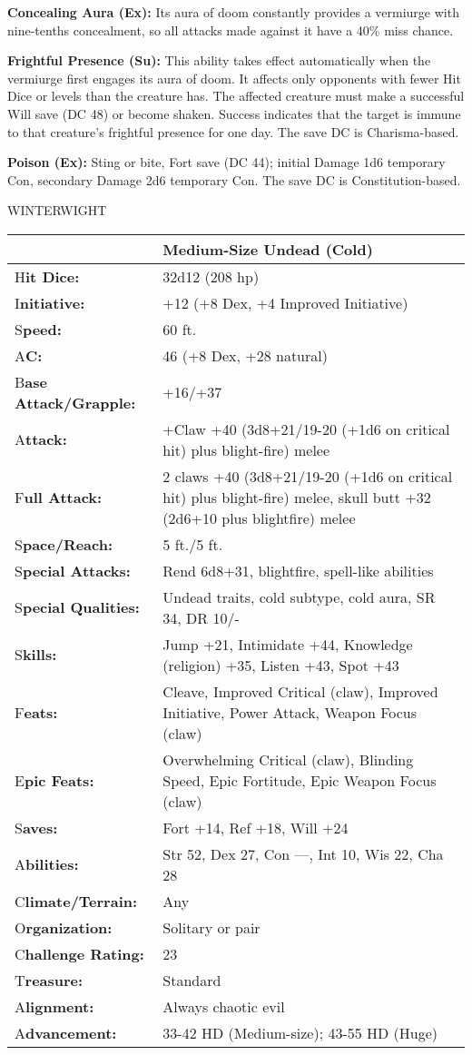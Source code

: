 \documentclass{article}
\begin{document}
{\textbf{Concealing Aura (Ex):} Its aura of doom constantly provides a vermiurge 
with nine-tenths concealment, so all attacks made against it have a 40\% miss chance. 

\textbf{Frightful Presence (Su):} This ability takes effect automatically when 
the vermiurge first engages its aura of doom. It affects only opponents with fewer 
Hit Dice or levels than the creature has. The affected creature must make a successful 
Will save (DC 48) or become shaken. Success indicates that the target is immune 
to that creature's frightful presence for one day. The save DC is Charisma-based.

\textbf{Poison (Ex):} Sting or bite, Fort save (DC 44); initial Damage 1d6 temporary 
Con, secondary Damage 2d6 temporary Con. The save DC is Constitution-based.

\vspace{12pt}
{\LARGE{}WINTERWIGHT }

\begin{tabular}{|>{\raggedright}p{66pt}|>{\raggedright}p{259pt}|}
\hline
  & Medium-Size Undead (Cold) \tabularnewline
\hline
H\textbf{it Dice:} & 32d12 (208 hp) \tabularnewline
\hline
I\textbf{nitiative:} & +12 (+8 Dex, +4 Improved Initiative) \tabularnewline
\hline
S\textbf{peed:} & 60 ft. \tabularnewline
\hline
A\textbf{C:} & 46 (+8 Dex, +28 natural) \tabularnewline
\hline
B\textbf{ase Attack/Grapple:} & +16/+37\tabularnewline
\hline
A\textbf{ttack:} & +Claw +40 (3d8+21/19-20 (+1d6 on critical hit) plus blight-fire) 
melee\tabularnewline
\hline
F\textbf{ull Attack:} & 2 claws +40 (3d8+21/19-20 (+1d6 on critical hit) plus blight-fire) 
melee, skull butt +32 (2d6+10 plus blightfire) melee\tabularnewline
\hline
S\textbf{pace/Reach:} & 5 ft./5 ft. \tabularnewline
\hline
S\textbf{pecial Attacks:} & Rend 6d8+31, blightfire, spell-like abilities \tabularnewline
\hline
S\textbf{pecial Qualities:} & Undead traits, cold subtype, cold aura, SR 34, DR 
10/-\tabularnewline
\hline
S\textbf{kills:} & Jump +21, Intimidate +44, Knowledge (religion) +35, Listen +43, 
Spot +43\tabularnewline
\hline
F\textbf{eats:} & Cleave, Improved Critical (claw), Improved Initiative, Power 
Attack, Weapon Focus (claw) \tabularnewline
\hline
E\textbf{pic Feats:} & Overwhelming Critical (claw), Blinding Speed, Epic Fortitude, 
Epic Weapon Focus (claw) \tabularnewline
\hline
S\textbf{aves:} & Fort +14, Ref +18, Will +24 \tabularnewline
\hline
A\textbf{bilities:} & Str 52, Dex 27, Con ---, Int 10, Wis 22, Cha 28 \tabularnewline
\hline
C\textbf{limate/Terrain:} & Any \tabularnewline
\hline
O\textbf{rganization:} & Solitary or pair \tabularnewline
\hline
C\textbf{hallenge Rating:} & 23 \tabularnewline
\hline
T\textbf{reasure:} & Standard \tabularnewline
\hline
A\textbf{lignment:} & Always chaotic evil \tabularnewline
\hline
A\textbf{dvancement:} & 33-42 HD (Medium-size); 43-55 HD (Huge) \tabularnewline
\hline
\end{tabular}

}
\end{document}
